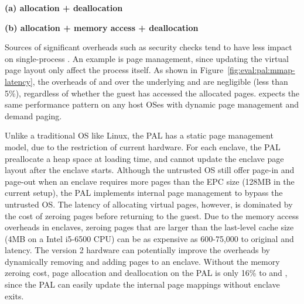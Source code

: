 \label{sec:eval:pal:memory}

\begin{figure*}[t!]
\centering
\footnotesize
{}
\parbox{0.49\textwidth}{\centering\bf (a) allocation + deallocation}
\parbox{0.49\textwidth}{\centering\bf (b) allocation + memory access + deallocation}
\caption{Latency of (a) allocating and deallocating a range of virtual pages, and (b) the same operations with writing to each page after allocation. Lower is better.
The comparison is between (1)  and  on Linux; (2)  and  on the Linux PAL, with and without a \seccomp{} filter ({\bf +SC}) and reference monitor ({\bf +RM}); (3) the same \hostapis{} on the \sgx{} PAL, with and without zeroing the pages before use ({\bf +Zero}).}
\label{fig:eval:pal:mmap-latency}
\end{figure*}

Sources of significant overheads such as security checks
tend to have less impact on
single-process \hostapis{}.
An example is page management,
since updating the virtual page layout only affect the process itself.
As shown in Figure~\ref{fig:eval:pal:mmap-latency},
the overheads of  and 
over the underlying  and 
are negligible (less than 5\%),
regardless of whether
the guest has accessed the allocated pages.
\graphene{} expects the same performance pattern on any host OSes with dynamic page management
and demand paging.



Unlike a traditional OS like Linux,
the \sgx{} PAL
has a static page management model,
due to the restriction of current \sgx{} hardware.
For each enclave,
the \sgx{} PAL preallocate a heap space
at loading time,
and cannot update the enclave page layout
after the enclave starts. 
Although the untrusted OS still offer page-in and page-out
when an enclave requires more pages
than the EPC size (128MB in the current setup),
the \sgx{} PAL implements
internal page management to bypass the untrusted OS.
The latency
of allocating virtual pages, however,
is dominated by the cost of zeroing pages before returning to the guest.
Due to the memory access overheads in enclaves,
zeroing pages that are larger than the last-level cache size (4MB on a Intel i5-6500 CPU)
can be as expensive as 600-75,000\x{} to original  and  latency.
The \sgx{} version 2 hardware
can potentially improve the overheads by dynamically removing and adding pages to an enclave.
Without the memory zeroing cost,
page allocation and deallocation on the \sgx{} PAL
is only \roughly{}16\% to  and ,
since the \sgx{} PAL
can easily update the internal page mappings 
without enclave exits.

